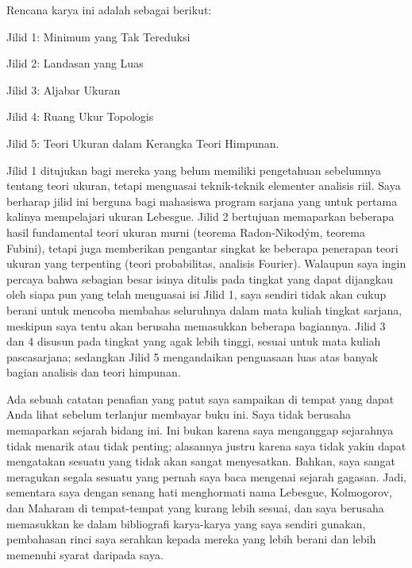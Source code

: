Rencana karya ini adalah sebagai berikut:
     
\medskip
     
\qquad\qquad Jilid 1:  Minimum yang Tak Tereduksi
     
\qquad\qquad Jilid 2:  Landasan yang Luas
     
\qquad\qquad Jilid 3:  Aljabar Ukuran
     
\qquad\qquad Jilid 4:  Ruang Ukur Topologis
     
\qquad\qquad Jilid 5:  Teori Ukuran dalam Kerangka Teori Himpunan.
     
\medskip
     
\noindent Jilid 1 ditujukan bagi mereka yang belum memiliki pengetahuan
sebelumnya tentang teori ukuran, tetapi menguasai teknik-teknik elementer
analisis riil.  Saya berharap jilid ini berguna bagi mahasiswa program sarjana
yang untuk pertama kalinya mempelajari ukuran Lebesgue.    Jilid 2 bertujuan
memaparkan beberapa hasil fundamental teori ukuran murni (teorema
Radon-Nikod\'ym, teorema Fubini), tetapi juga memberikan pengantar singkat
ke beberapa penerapan teori ukuran yang terpenting (teori probabilitas,
analisis Fourier).   Walaupun saya ingin percaya bahwa sebagian besar isinya
ditulis pada tingkat yang dapat dijangkau oleh siapa pun yang telah menguasai
isi Jilid 1, saya sendiri tidak akan cukup berani untuk mencoba membahas
seluruhnya dalam mata kuliah tingkat sarjana, meskipun saya tentu akan
berusaha memasukkan beberapa bagiannya.   Jilid 3 dan 4 disusun pada tingkat
yang agak lebih tinggi, sesuai untuk mata kuliah pascasarjana;  sedangkan
Jilid 5 mengandaikan penguasaan luas atas banyak bagian analisis dan
teori himpunan.
     
Ada sebuah catatan penafian yang patut saya sampaikan di tempat yang dapat
Anda lihat sebelum terlanjur membayar buku ini.   Saya tidak berusaha
memaparkan sejarah bidang ini.   Ini bukan karena saya menganggap sejarahnya
tidak menarik atau tidak penting;  alasannya justru karena saya tidak yakin
dapat mengatakan sesuatu yang tidak akan sangat menyesatkan.
Bahkan, saya sangat meragukan segala sesuatu yang pernah saya baca mengenai
sejarah gagasan.   Jadi, sementara saya dengan senang hati
menghormati nama Lebesgue, Kolmogorov, dan Maharam di tempat-tempat yang
kurang lebih sesuai, dan saya berusaha memasukkan ke dalam bibliografi
karya-karya yang saya sendiri gunakan, pembahasan rinci saya serahkan kepada
mereka yang lebih berani dan lebih memenuhi syarat daripada saya.
     
